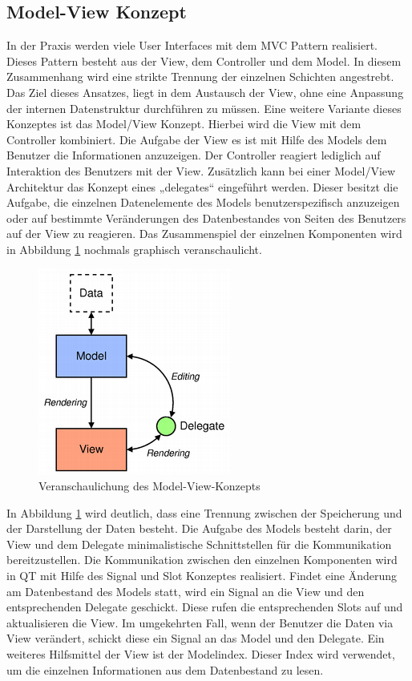 \subsection{Model-View Konzept}

In der Praxis werden viele User Interfaces mit dem MVC Pattern realisiert. Dieses Pattern besteht aus der View, dem Controller und dem Model. In diesem Zusammenhang wird eine strikte Trennung der einzelnen Schichten angestrebt. Das Ziel dieses Ansatzes, liegt in dem Austausch der View, ohne eine Anpassung der internen Datenstruktur durchführen zu müssen. Eine weitere Variante dieses Konzeptes ist das Model/View Konzept. Hierbei wird die View mit dem Controller kombiniert. Die Aufgabe der View es ist mit Hilfe des Models dem Benutzer die Informationen anzuzeigen. Der Controller reagiert lediglich auf Interaktion des Benutzers mit der View. Zusätzlich kann bei einer Model/View Architektur das Konzept eines „delegates“ eingeführt werden. Dieser besitzt die Aufgabe, die einzelnen Datenelemente des Models benutzerspezifisch anzuzeigen oder auf bestimmte Veränderungen des Datenbestandes von Seiten des Benutzers auf der View zu reagieren. Das Zusammenspiel der einzelnen Komponenten wird in Abbildung \ref{pic:ModelView} nochmals graphisch veranschaulicht.

\begin{figure}[H]
	\centering
	\includegraphics[scale=1.0]{images/ModelView.png}
	\caption{Veranschaulichung des Model-View-Konzepts}
	\label{pic:ModelView}
\end{figure}

In Abbildung \ref{pic:ModelView} wird deutlich, dass eine Trennung zwischen der Speicherung und der Darstellung der Daten besteht. Die Aufgabe des Models besteht darin, der View und dem Delegate minimalistische Schnittstellen für die Kommunikation bereitzustellen. Die Kommunikation zwischen den einzelnen Komponenten wird in QT mit Hilfe des Signal und Slot Konzeptes realisiert. Findet eine Änderung am Datenbestand des Models statt, wird ein Signal an die View und den entsprechenden Delegate geschickt. Diese rufen die entsprechenden Slots auf und aktualisieren die View. Im umgekehrten Fall, wenn der Benutzer die Daten via View verändert, schickt diese ein Signal an das Model und den Delegate. Ein weiteres Hilfsmittel der View ist der Modelindex. Dieser Index wird verwendet, um die einzelnen Informationen aus dem Datenbestand zu lesen. \\

